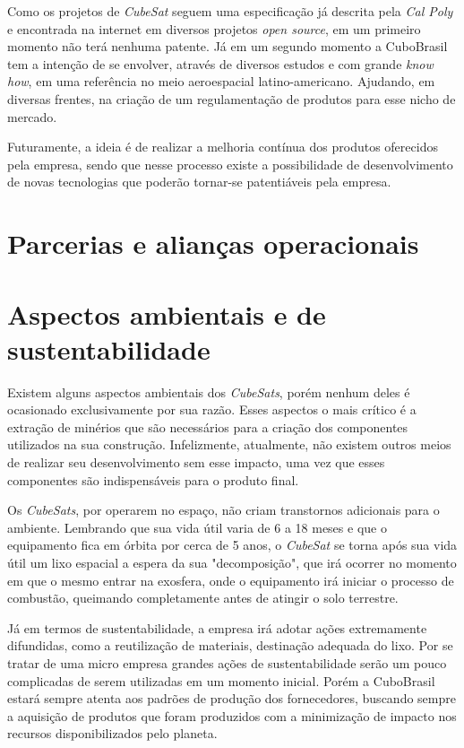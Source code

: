 \documentclass[
	12pt,				%
	openright,			%
	oneside,			%
	a4paper,			%
	english,			%
	french,				%
	spanish,			%
	brazil				%
	]{abntex2}
\begin{document}
	Como os projetos de \textit{CubeSat} seguem uma especificação já descrita pela \textit{Cal Poly} e encontrada na internet em diversos projetos \textit{open source}, em um primeiro momento não terá nenhuma patente. Já em um segundo momento a CuboBrasil tem a intenção de se envolver, através de diversos estudos e com grande \textit{know how}, em uma referência no meio aeroespacial latino-americano. Ajudando, em diversas frentes, na criação de um regulamentação de produtos para esse nicho de mercado.
	
	Futuramente, a ideia é de realizar a melhoria contínua dos produtos oferecidos pela empresa, sendo que nesse processo existe a possibilidade de desenvolvimento de novas tecnologias que poderão tornar-se patentiáveis pela empresa.

\section[Parcerias e alianças operacionais]{Parcerias e alianças operacionais}


\section[Aspectos ambientais e de sustentabilidade]{Aspectos ambientais e de sustentabilidade}

	Existem alguns aspectos ambientais dos \textit{CubeSats}, porém nenhum deles é ocasionado exclusivamente por sua razão. Esses aspectos o mais crítico é a extração de minérios que são necessários para a criação dos componentes utilizados na sua construção. Infelizmente, atualmente, não existem outros meios de realizar seu desenvolvimento sem esse impacto, uma vez que esses componentes são indispensáveis para o produto final. 
	
	Os \textit{CubeSats}, por operarem no espaço, não criam transtornos adicionais para o ambiente. Lembrando que sua vida útil varia de 6 a 18 meses e que o equipamento fica em órbita por cerca de 5 anos, o \textit{CubeSat} se torna após sua vida útil um lixo espacial a espera da sua "decomposição", que irá ocorrer no momento em que o mesmo entrar na exosfera, onde o equipamento irá iniciar o processo de combustão, queimando completamente antes de atingir o solo terrestre.
	
	Já em termos de sustentabilidade, a empresa irá adotar ações extremamente difundidas, como a reutilização de materiais, destinação adequada do lixo. Por se tratar de uma micro empresa grandes ações de sustentabilidade serão um pouco complicadas de serem utilizadas em um momento inicial. Porém a CuboBrasil estará sempre atenta aos padrões de produção dos fornecedores, buscando sempre a aquisição de produtos que foram produzidos com a minimização de impacto nos recursos disponibilizados pelo planeta. 
\end{document}
